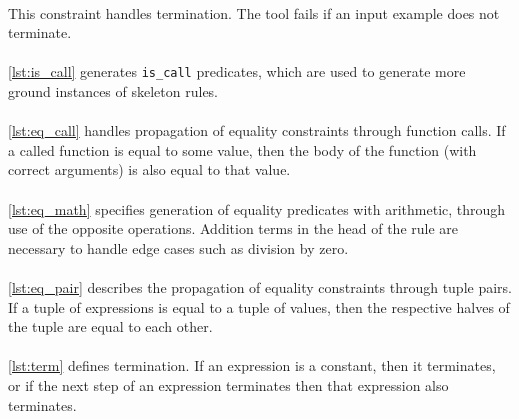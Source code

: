  
\mbox{} \\
This constraint handles termination. The tool fails if an input example does not terminate.\\

 
\mbox{} \\
\ref{lst:is_call} generates \lstinline{is_call} predicates, which are used to generate more ground instances of skeleton rules. \\ %

 
\mbox{} \\
\ref{lst:eq_call} handles propagation of equality constraints through function calls. If a called function is equal to some value, then the body of the function (with correct arguments) is also equal to that value. \\

 
\mbox{} \\
\ref{lst:eq_math} specifies generation of equality predicates with arithmetic, through use of the opposite operations. Addition terms in the head of the rule are necessary to handle edge cases such as division by zero. \\


\mbox{}\\
\ref{lst:eq_pair} describes the propagation of equality constraints through tuple pairs. If a tuple of expressions is equal to a tuple of values, then the respective halves of the tuple are equal to each other. \\

 
\mbox{} \\
\ref{lst:term} defines termination. If an expression is a constant, then it terminates, or if the next step of an expression terminates then that expression also terminates. \\

